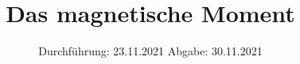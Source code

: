 

\subject{V105}
\title{Das magnetische Moment}
\date{%
  Durchführung: 23.11.2021
  \hspace{3em}
  Abgabe: 30.11.2021
}



\maketitle
\thispagestyle{empty}
\tableofcontents
\newpage






\printbibliography{}
\newpage




